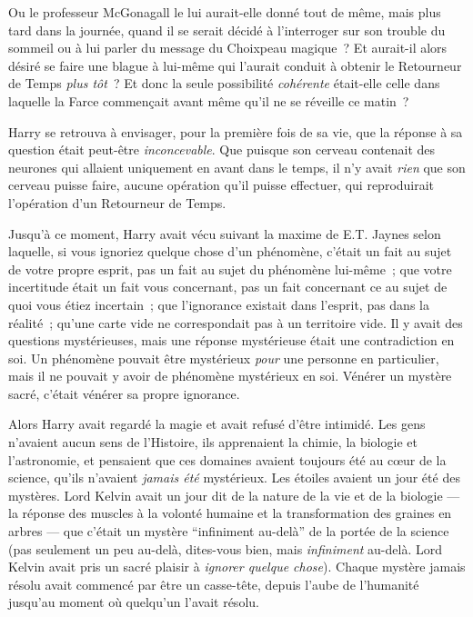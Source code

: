 Ou le professeur McGonagall le lui aurait-elle donné tout de même, mais plus tard dans la journée, quand il se serait décidé à l'interroger sur son trouble du sommeil ou à lui parler du message du Choixpeau magique~? Et aurait-il alors désiré se faire une blague à lui-même qui l'aurait conduit à obtenir le Retourneur de Temps \emph{plus tôt}~? Et donc la seule possibilité \emph{cohérente} était-elle celle dans laquelle la Farce commençait avant même qu'il ne se réveille ce matin~?

Harry se retrouva à envisager, pour la première fois de sa vie, que la réponse à sa question était peut-être \emph{inconcevable}. Que puisque son cerveau contenait des neurones qui allaient uniquement en avant dans le temps, il n'y avait \emph{rien} que son cerveau puisse faire, aucune opération qu'il puisse effectuer, qui reproduirait l'opération d'un Retourneur de Temps.

Jusqu'à ce moment, Harry avait vécu suivant la maxime de E.T. Jaynes selon laquelle, si vous ignoriez quelque chose d'un phénomène, c'était un fait au sujet de votre propre esprit, pas un fait au sujet du phénomène lui-même~; que votre incertitude était un fait vous concernant, pas un fait concernant ce au sujet de quoi vous étiez incertain~; que l'ignorance existait dans l'esprit, pas dans la réalité~; qu'une carte vide ne correspondait pas à un territoire vide. Il y avait des questions mystérieuses, mais une réponse mystérieuse était une contradiction en soi. Un phénomène pouvait être mystérieux \emph{pour} une personne en particulier, mais il ne pouvait y avoir de phénomène mystérieux en soi. Vénérer un mystère sacré, c'était vénérer sa propre ignorance.

Alors Harry avait regardé la magie et avait refusé d'être intimidé. Les gens n'avaient aucun sens de l'Histoire, ils apprenaient la chimie, la biologie et l'astronomie, et pensaient que ces domaines avaient toujours été au cœur de la science, qu'ils n'avaient \emph{jamais été} mystérieux. Les étoiles avaient un jour été des mystères. Lord Kelvin avait un jour dit de la nature de la vie et de la biologie — la réponse des muscles à la volonté humaine et la transformation des graines en arbres — que c'était un mystère “infiniment au-delà” de la portée de la science (pas seulement un peu au-delà, dites-vous bien, mais \emph{infiniment} au-delà. Lord Kelvin avait pris un sacré plaisir à \emph{ignorer quelque chose}). Chaque mystère jamais résolu avait commencé par être un casse-tête, depuis l'aube de l'humanité jusqu'au moment où quelqu'un l'avait résolu.

